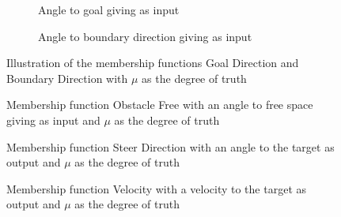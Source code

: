 \documentclass[../Head/Main.tex]{subfiles}
\begin{document}
\begin{figure}[H]
	\centering
	\begin{subfigure}[b]{0.49\textwidth}
		\centering
		
		\caption{Angle to goal giving as input}
		\label{fig:MSF_Goal_direction}
	\end{subfigure}
	\hfill
	\begin{subfigure}[b]{0.49\textwidth}
		
		\caption{Angle to boundary direction giving as input}
		\label{fig:MSF_Boundary_direction}
	\end{subfigure}
	\caption{Illustration of the membership functions Goal Direction and Boundary Direction with $\mu$ as the degree of truth}
	\label{fig:MSF_Goal_boundary}
\end{figure}

\begin{figure}[H]
	\centering
	
	\caption{Membership function Obstacle Free with an angle to free space giving as input and  $\mu$ as the degree of truth}
	\label{fig:MSF_Obstacle_free}
\end{figure}

\begin{figure}[H]
	\centering
	
	\caption{Membership function Steer Direction with an angle to the target as output and $\mu$ as the degree of truth}
	\label{fig:MSF_Steer_direction}
\end{figure}

\begin{figure}[H]
	\centering
	
	\caption{Membership function Velocity with a velocity to the target as output and $\mu$ as the degree of truth}				\label{fig:MSF_Velocity}
\end{figure}
\end{document}
